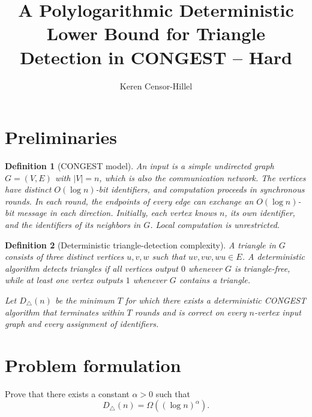 \documentclass[10pt]{article}
\title{A Polylogarithmic Deterministic Lower Bound for Triangle Detection in CONGEST -- Hard}
\author{Keren Censor-Hillel}
\date{}
\newtheorem{definition}{Definition}
\begin{document}
\maketitle

\section{Preliminaries}

\begin{definition}[CONGEST model]
An input is a simple undirected graph $G=(V,E)$ with $|V|=n$, which is also
the communication network. The vertices have distinct $O(\!\log n)$-bit
identifiers, and computation proceeds in synchronous rounds. In each round,
the endpoints of every edge can exchange an $O(\!\log n)$-bit message in
each direction. Initially, each vertex knows $n$, its own identifier, and
the identifiers of its neighbors in $G$. Local computation is unrestricted.
\end{definition}

\begin{definition}[Deterministic triangle-detection complexity]
A triangle in $G$ consists of three distinct vertices $u,v,w$ such that
$uv,vw,wu\in E$. A deterministic algorithm detects triangles if all vertices
output $0$ whenever $G$ is triangle-free, while at least one vertex outputs
$1$ whenever $G$ contains a triangle.

Let $D_{\triangle}(n)$ be the minimum $T$ for which there exists a
deterministic CONGEST algorithm that terminates within $T$ rounds and is
correct on every $n$-vertex input graph and every assignment of identifiers.
\end{definition}

\section{Problem formulation}

Prove that there exists a constant $\alpha>0$ such that
\[
D_{\triangle}(n)=\Omega\!\left((\log n)^\alpha\right).
\]
\end{document}
